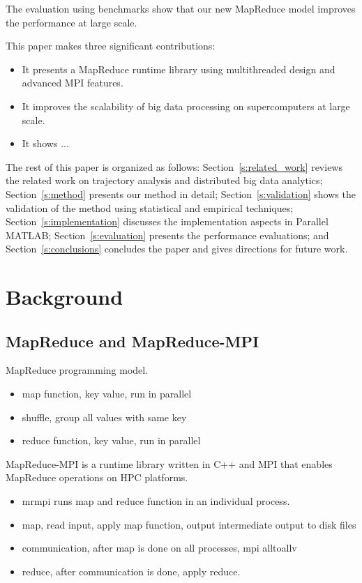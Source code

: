 \documentclass[10pt,conference,compsocconf]{IEEEtran}
\begin{document}
The evaluation using benchmarks show that our new MapReduce
model improves the performance at large scale.

This paper makes three significant contributions:
\begin{itemize}
\item It presents a MapReduce runtime library using multithreaded 
design and advanced MPI features.
\item It improves the scalability of big data processing on supercomputers
at large scale.
\item It shows ...
\end{itemize}

The rest of this paper is organized as follows:
Section~\ref{s:related_work} reviews the related work on trajectory
analysis and distributed big data analytics; Section~\ref{s:method}
presents our method in detail; Section~\ref{s:validation} shows the
validation of the method using statistical and empirical techniques;
Section~\ref{s:implementation} discusses the implementation aspects in
Parallel MATLAB; Section~\ref{s:evaluation} presents the performance
evaluations; and Section~\ref{s:conclusions} concludes the paper and
gives directions for future work.

\section{Background}
\label{background}
\subsection{MapReduce and MapReduce-MPI}
MapReduce programming model. 
\begin{itemize}
\item map function, key value, run in parallel
\item shuffle, group all values with same key
\item reduce function, key value, run in parallel
\end{itemize}
MapReduce-MPI is a runtime library written in C++ and MPI that
enables MapReduce operations on HPC platforms.
\begin{itemize}
\item mrmpi runs map and reduce function in an individual process.
\item map, read input, apply map function, output intermediate 
output to disk files
\item communication, after map is done on all processes, 
mpi alltoallv
\item reduce, after communication is done, apply reduce.
\end{itemize}
\end{document}

